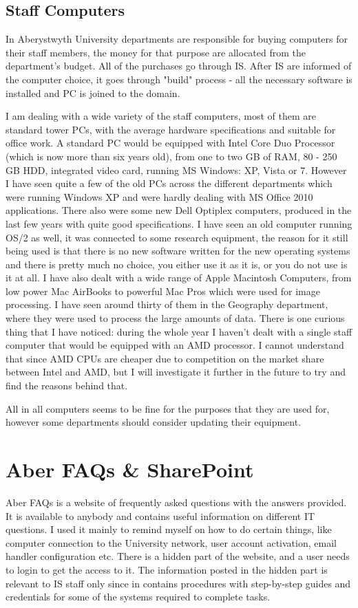 \documentclass[10pt,a4paper,headinclude=true,twoside]{report}
\begin{document}
\subsection{Staff Computers}
In Aberystwyth University departments are responsible for buying computers for their staff members, the money for that purpose are allocated from the department's budget. All of the purchases go through IS. After IS are informed of the computer choice, it goes through "build" process - all the necessary software is installed and PC is joined to the domain. 

I am dealing with a wide variety of the staff computers, most of them are standard tower PCs, with the average hardware specifications and suitable for office work. A standard PC would be equipped with Intel Core Duo Processor (which is now more than six years old), from one to two GB of RAM, 80 - 250 GB HDD, integrated video card, running MS Windows: XP, Vista or 7. However I have seen quite a few of the old PCs across the different departments which were running Windows XP and were hardly dealing with MS Office 2010 applications. There also were some new Dell Optiplex computers, produced in the last few years with quite good specifications. I have seen an old computer running OS/2 as well, it was connected to some research equipment, the reason for it still being used is that there is no new software written for the new operating systems and there is pretty much no choice, you either use it as it is, or you do not use is it at all. I have also dealt with a wide range of Apple Macintosh Computers, from low power Mac AirBooks to powerful Mac Pros which were used for image processing. I have seen around thirty of them in the Geography department, where they were used to process the large amounts of data. There is one curious thing that I have noticed: during the whole year I haven't dealt with a single staff computer that would be equipped with an AMD processor. I cannot understand that since AMD CPUs are cheaper due to competition on the market share between Intel and AMD, but I will investigate it further in the future to try and find the reasons behind that.

All in all computers seems to be fine for the purposes that they are used for, however some departments should consider updating their equipment. 

\section{Aber FAQs \& SharePoint}
Aber FAQs is a website of frequently asked questions with the answers provided. It is available to anybody and contains useful information on different IT questions. I used it mainly to remind myself on how to do certain things, like computer connection to the University network, user account activation, email handler configuration etc. There is a hidden part of the website, and a user needs to login to get the access to it. The information posted in the hidden part is relevant to IS staff only since in contains procedures with step-by-step guides and credentials for some of the systems required to complete tasks.
\end{document}
